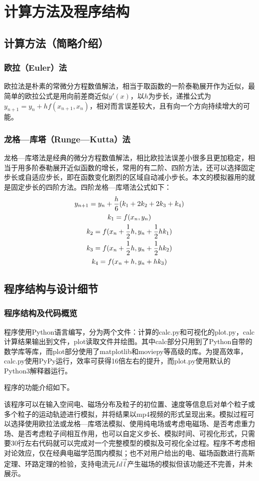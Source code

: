 \documentclass[UTF-8,cs4size]{ctexart}
\begin{document}
\section{计算方法及程序结构}
\subsection{计算方法（简略介绍）}
\subsubsection{欧拉（Euler）法}
欧拉法是朴素的常微分方程数值解法，相当于取函数的一阶泰勒展开作为近似，最简单的欧拉公式是用向前差商近似$y'(x)$，以$h$为步长，递推公式为$y_{n+1} = y_n + hf(x_{n+1},x_{n})$，相对而言误差较大，且有向一个方向持续增大的可能。
\subsubsection{龙格—库塔（Runge—Kutta）法}
龙格—库塔法是经典的微分方程数值解法，相比欧拉法误差小很多且更加稳定，相当于用多阶泰勒展开近似函数的增长，常用的有二阶、四阶方法，还可以选择固定步长或自适应步长，即在函数变化剧烈的区域自动减小步长。本文的模拟器用的就是固定步长的四阶方法。四阶龙格—库塔法公式如下：
\begin{gather}
	y_{n+1} = y_n + \frac{h}{6}(k_1+2k_2+2k_3+k_4) \notag \\
	k_1 = f(x_n,y_n) \notag \\
	k_2 = f(x_n+\frac12h,y_n+\frac12hk_1) \notag \\
	k_3 = f(x_n+\frac12h,y_n+\frac12hk_2) \notag \\
	k_4 = f(x_n+h,y_n+hk_3)
\end{gather}
\subsection{程序结构与设计细节}
\subsubsection{程序结构及代码概览}
程序使用Python语言编写，分为两个文件：计算的calc.py和可视化的plot.py，calc计算结果输出到文件，plot读取文件并绘图。其中calc部分只用到了Python自带的数学库等库，而plot部分使用了matplotlib和moviepy等高级的库。为提高效率，calc.py使用PyPy运行，效率可获得16倍左右的提升，而plot.py使用默认的Python3解释器运行。


程序的功能介绍如下。


该程序可以在输入空间电、磁场分布及粒子的初位置、速度等信息后对单个粒子或多个粒子的运动轨迹进行模拟，并将结果以mp4视频的形式呈现出来。模拟过程可以选择使用欧拉法或龙格—库塔法模拟、使用纯电场或考虑电磁场、是否考虑重力场、是否考虑粒子间相互作用，也可以自定义步长、模拟时间、可视化形式，只需要30行左右代码就可以完成对一个完整模型的模拟及可视化全过程。程序不考虑相对论效应，仅在经典电磁学范围内模拟；也不对用户给出的电、磁场函数进行高斯定理、环路定理的检验，支持电流元$Id\vec{l}$产生磁场的模拟但该功能还不完善，并未展示。
\end{document}

